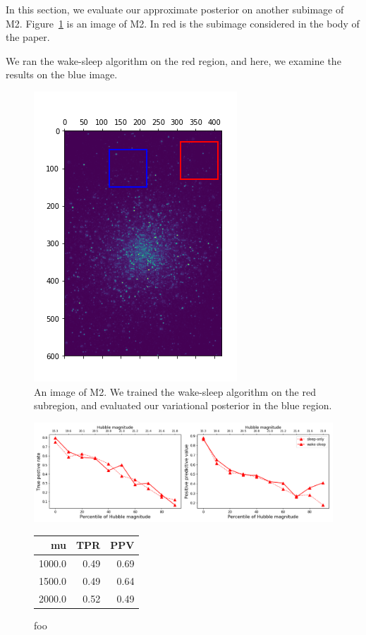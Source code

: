In this section, we evaluate our approximate posterior on another subimage of M2. Figure~\ref{fig:marked_m2} is an image of M2. In red is the subimage considered in the body of the paper. 

We ran the wake-sleep algorithm on the red region, and here, we examine the results on the blue image. 

\begin{figure}
    \centering
    \includegraphics{figures/sdss_m2_image2_marked.png}
    \caption{An image of M2. We trained the wake-sleep algorithm on the red subregion, and evaluated our variational posterior in the blue region. }
    \label{fig:marked_m2}
\end{figure}

\begin{figure}[ht]
\begin{minipage}[b]{0.6\textwidth}
\centering
\includegraphics[width = \textwidth]{figures/summary_statistics_m2_alt.png}
\end{minipage}\hfill
\begin{minipage}[b]{0.39\textwidth}
\centering
\begin{tabular}{rrr}
\toprule
     mu &   TPR &   PPV \\
\midrule
 1000.0 &  0.49 &  0.69 \\
 1500.0 &  0.49 &  0.64 \\
 2000.0 &  0.52 &  0.49 \\
\bottomrule
\end{tabular}
\end{minipage}\hfill
\caption{foo}
\end{figure}
